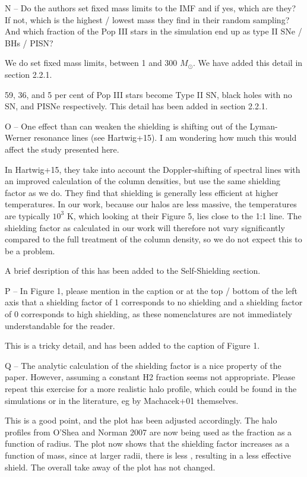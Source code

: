 \documentclass[11pt]{article}
\newenvironment{referee}[1][]{%
    \ignorespaces%
    \begin{mdframed}[style=myquotestyle,#1]%
}{%
    \end{mdframed}%
    \ignorespacesafterend%
}%
\begin{document}
\begin{referee}
N -- Do the authors set fixed mass limits to the IMF and if yes, which are they?  If not, which is the highest / lowest mass they find in their random sampling?  And which fraction of the Pop III stars in the simulation end up as type II SNe / BHs / PISN?
\end{referee}
We do set fixed mass limits, between 1 and 300 $M_{\odot}$. We have added this detail in section 2.2.1.  

59, 36, and 5 per cent of Pop III stars become Type II SN, black holes with no SN, and PISNe respectively. This detail has been added in section 2.2.1.

\begin{referee}
O -- One effect than can weaken the shielding is shifting out of the Lyman-Werner resonance lines (see Hartwig+15). I am wondering how much this would affect the study presented here.
\end{referee}

In Hartwig+15, they take into account the Doppler-shifting of spectral lines with an improved calculation of the column densities, but use the same shielding factor as we do. They find that shielding is generally less efficient at higher temperatures. In our work, because our halos are less massive, the temperatures are typically $10^{3}$ K, which looking at their Figure 5, lies close to the 1:1 line. The shielding factor as calculated in our work will therefore not vary significantly compared to the full treatment of the column density, so we do not expect this to be a problem. 

A brief desription of this has been added to the \hh{} Self-Shielding section. 

\begin{referee}
P -- In Figure 1, please mention in the caption or at the top / bottom of the left axis that a shielding factor of 1 corresponds to no shielding and a shielding factor of 0 corresponds to high shielding, as these nomenclatures are not immediately understandable for the reader.
\end{referee}
This is a tricky detail, and has been added to the caption of Figure 1.

\begin{referee}
Q -- The analytic calculation of the shielding factor is a nice property of the paper. However, assuming a constant H2 fraction seems not appropriate. Please repeat this exercise for a more realistic halo profile, which could be found in the simulations or in the literature, eg by Machacek+01 themselves.
\end{referee}
This is a good point, and the plot has been adjusted accordingly. The halo profiles from O'Shea and Norman 2007 are now being used as the \hh{} fraction as a function of radius. The plot now shows that the shielding factor increases as a function of mass, since at larger radii, there is less \hh{}, resulting in a less effective \hh{} shield. The overall take away of the plot has not changed. 
\end{document}
